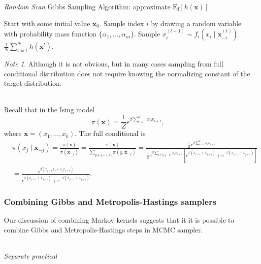 \documentclass[11pt]{article}\usepackage[]{graphicx}\usepackage[]{color}
\numberwithin{algorithm}{section}
\theoremstyle{remark}
\newtheorem*{mynote}{Note}
\theoremstyle{definition}
\newenvironment{example}[1]{\begin{trivlist}
\item[\hskip \labelsep {\bfseries Example}: \underline{#1}]\ \\}{\end{trivlist}}
\begin{document}
\begin{algorithm}
  \caption{\textit{Random Scan} Gibbs Sampling Algorithm: approximate $\text{E}_{\mathbf{f}}[h(\mathbf{x})]$}
  \label{giibs}
  \begin{algorithmic}[1]
    \STATE Start with some initial value $\mathbf{x}_0$.
    \STATE Sample index $i$ by drawing a random variable with probability mass function 
    $\{\alpha_1,\dots,\alpha_m\}$.
    \STATE Sample $x_i^{(t+1)} \sim f_i\left(x_i \mid \mathbf{x}_{-i}^{(t)}\right)$
    \ENDFOR
    \RETURN $\frac{1}{N} \sum_{t = 1}^N h(\mathbf{x}^t)$.
  \end{algorithmic}
\end{algorithm}

\begin{mynote}
  Although it is not obvious, but in many cases sampling from full conditional distribution does not require
  knowing the normalizing constant of the target distribution.
\end{mynote}

\begin{example}{Ising model (continued)}
  Recall that in the Ising model 
  \[
  \pi(\mathbf{x}) = \frac{1}{Z} e^{\beta \sum_{i=1}^k x_i x_{i+1}},
  \]
  where $\mathbf{x} = (x_1,\dots,x_k)$. 
  The full conditional is
  \[
  \begin{split}
    &\pi(x_j\mid \mathbf{x}_{-j}) = \frac{\pi(\mathbf{x})}{\pi(\mathbf{x}_{-j})} = 
    \frac{\pi(\mathbf{x})}{\sum_{y \in \{-1,1\}}\pi(y, \mathbf{x}_{-j})} =
    \frac{\frac{1}{Z} e^{\beta \sum_{i=1}^k x_i x_{i+1}}}{\frac{1}{Z}e^{\beta \sum_{i \notin \{j,j-1\}}x_i x_{i+1}}
      \left[e^{\beta(x_{j-1} + x_{j+1})} + e^{-\beta(x_{j-1} + x_{j+1})}\right]} \\
    &= \frac{e^{\beta(x_{j-1}x_j + x_j x_{j+1})}}{e^{\beta(x_{j-1} + x_{j+1})} + e^{-\beta(x_{j-1} + x_{j+1})}}.
  \end{split}
  \]
\end{example}


\subsubsection{Combining Gibbs and Metropolis-Hastings samplers}
Our discussion of combining Markov kernels suggests that it it is possible to combine Gibbs and
Metropolis-Hastings steps in MCMC sampler. 

\begin{example}{Beta-binomial hierarchical model} 
  \textit{Separate practical}
\end{example}
\end{document}
